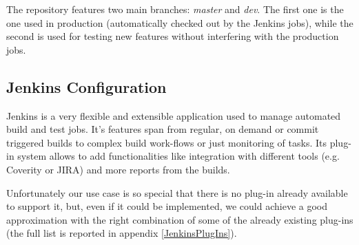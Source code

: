 \documentclass{lhcbnote}
\begin{document}
The repository features two main branches: \emph{master} and \emph{dev}.  The
first one is the one used in production (automatically checked out by the
Jenkins jobs), while the second is used for testing new features without
interfering with the production jobs.

\subsection{Jenkins Configuration}
\label{Jenkins}
Jenkins is a very flexible and extensible application used to manage automated
build and test jobs.  It's features span from regular, on demand or commit
triggered builds to complex build work-flows or just monitoring of tasks.  Its
plug-in system allows to add functionalities like integration with different
tools (e.g. Coverity or JIRA) and more reports from the builds.

Unfortunately our use case is so special that there is no plug-in already
available to support it, but, even if it could be implemented, we could achieve
a good approximation with the right combination of some of the already existing
plug-ins (the full list is reported in appendix \ref{JenkinsPlugIns}).
\end{document}
